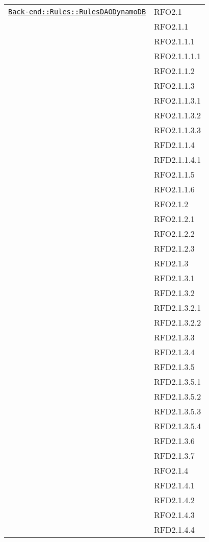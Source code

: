 \begin{longtable}{|>{\centering}m{10cm}|m{3cm}<{\centering}|}
\hyperref[Back-end::Rules::RulesDAODynamoDB]{\texttt{Back-end::Rules::RulesDAODynamoDB}} & RFO2.1\\
& RFO2.1.1\\
& RFO2.1.1.1\\
& RFO2.1.1.1.1\\
& RFO2.1.1.2\\
& RFO2.1.1.3\\
& RFO2.1.1.3.1\\
& RFO2.1.1.3.2\\
& RFO2.1.1.3.3\\
& RFD2.1.1.4\\
& RFD2.1.1.4.1\\
& RFO2.1.1.5\\
& RFO2.1.1.6\\
& RFO2.1.2\\
& RFO2.1.2.1\\
& RFO2.1.2.2\\
& RFD2.1.2.3\\
& RFD2.1.3\\
& RFD2.1.3.1\\
& RFD2.1.3.2\\
& RFD2.1.3.2.1\\
& RFD2.1.3.2.2\\
& RFD2.1.3.3\\
& RFD2.1.3.4\\
& RFD2.1.3.5\\
& RFD2.1.3.5.1\\
& RFD2.1.3.5.2\\
& RFD2.1.3.5.3\\
& RFD2.1.3.5.4\\
& RFD2.1.3.6\\
& RFD2.1.3.7\\
& RFO2.1.4\\
& RFD2.1.4.1\\
& RFD2.1.4.2\\
& RFO2.1.4.3\\
& RFD2.1.4.4\\ \hline


\end{longtable}

